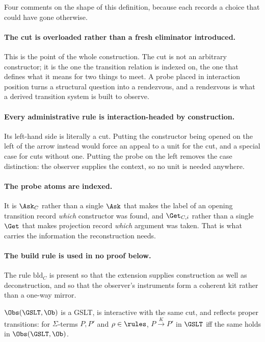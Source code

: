 Four comments on the shape of this definition, because each records a choice that
could have gone otherwise.

\paragraph{The cut is overloaded rather than a fresh eliminator introduced.}
This is the point of the whole construction. The cut is not an arbitrary
constructor; it is the one the transition relation is indexed on, the one that
defines what it means for two things to meet. A probe placed in interaction
position turns a structural question into a rendezvous, and a rendezvous is what a
derived transition system is built to observe.

\paragraph{Every administrative rule is interaction-headed by construction.}
Its left-hand side is literally a cut. Putting the constructor being opened on the
left of the arrow instead would force an appeal to a unit for the cut, and a
special case for cuts without one. Putting the probe on the left removes the case
distinction: the observer supplies the context, so no unit is needed anywhere.

\paragraph{The probe atoms are indexed.}
It is $\Ask_C$ rather than a single $\Ask$ that makes the label of an opening
transition record \emph{which} constructor was found, and $\Get_{C,i}$ rather than
a single $\Get$ that makes projection record \emph{which} argument was taken. That
is what carries the information the reconstruction needs.

\paragraph{The build rule is used in no proof below.}
The rule $\mathrm{bld}_C$ is present so that the extension supplies construction as
well as deconstruction, and so that the observer's instruments form a coherent kit rather
than a one-way mirror.

\begin{proposition}
\label{ox:prop:still}
$\Obs(\GSLT,\Ob)$ is a GSLT, is interactive with the same cut, and reflects proper
transitions: for $\Sigma$-terms $P,P'$ and $\rho \in \rules$, $P \xrightarrow{K} P'$
in $\GSLT$ iff the same holds in $\Obs(\GSLT,\Ob)$.
\end{proposition}


